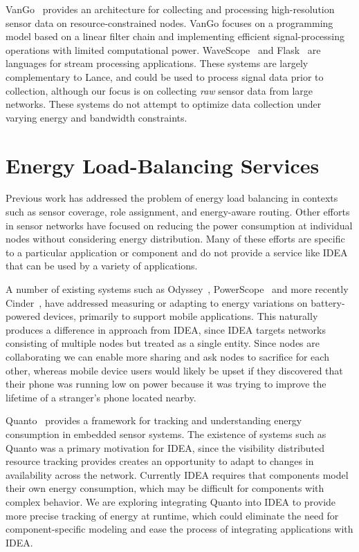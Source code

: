 VanGo~\cite{vango} provides an architecture for collecting and processing
high-resolution sensor data on resource-constrained nodes. VanGo focuses on a
programming model based on a linear filter chain and implementing efficient
signal-processing operations with limited computational power.
WaveScope~\cite{wavescope} and Flask~\cite{flask-tr} are languages for stream
processing applications. These systems are largely complementary to Lance,
and could be used to process signal data prior to collection, although our
focus is on collecting \textit{raw} sensor data from large networks. These
systems do not attempt to optimize data collection under varying energy and
bandwidth constraints. 


\section{Energy Load-Balancing Services}
\label{idea-sec-related}

Previous work has addressed the problem of energy load balancing in contexts
such as sensor coverage, role assignment, and energy-aware routing. Other
efforts in sensor networks have focused on reducing the power consumption at
individual nodes without considering energy distribution. Many of these
efforts are specific to a particular application or component and do not
provide a service like IDEA that can be used by a variety of applications. 

A number of existing systems such as Odyssey~\cite{odyssey-osr99},
PowerScope~\cite{powerscope-wmcsa99} and more recently
Cinder~\cite{cinder-mobiheld09}, have addressed measuring or adapting to
energy variations on battery-powered devices, primarily to support mobile
applications. This naturally produces a difference in approach from IDEA,
since IDEA targets networks consisting of multiple nodes but treated as a
single entity. Since nodes are collaborating we can enable more sharing and
ask nodes to sacrifice for each other, whereas mobile device users would
likely be upset if they discovered that their phone was running low on power
because it was trying to improve the lifetime of a stranger's phone located
nearby.

Quanto~\cite{quanto-osdi08} provides a framework for tracking and
understanding energy consumption in embedded sensor systems. The existence of
systems such as Quanto was a primary motivation for IDEA, since the
visibility distributed resource tracking provides creates an opportunity to
adapt to changes in availability across the network. Currently IDEA requires
that components model their own energy consumption, which may be difficult
for components with complex behavior. We are exploring integrating Quanto
into IDEA to provide more precise tracking of energy at runtime, which could
eliminate the need for component-specific modeling and ease the process of
integrating applications with IDEA.

